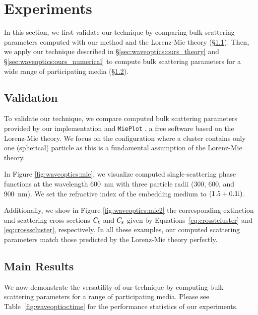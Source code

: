 \section{Experiments}
\label{sec:waveoptics:results}

In this section, we first validate our technique by comparing bulk scattering parameters computed with our method and the Lorenz-Mie theory (\S\ref{ssec:result_validation}).
Then, we apply our technique described in \S\ref{sec:waveoptics:ours_theory} and \S\ref{sec:waveoptics:ours_numerical} to compute bulk scattering parameters for a wide range of participating media (\S\ref{ssec:result_main}).


\subsection{Validation}
\label{ssec:result_validation}

To validate our technique, we compare computed bulk scattering parameters provided by our implementation and \texttt{MiePlot} \cite{laven2011mieplot}, a free software based on the Lorenz-Mie theory.
We focus on the configuration where a cluster contains only one (spherical) particle as this is a fundamental assumption of the Lorenz-Mie theory.



In Figure \ref{fig:waveoptics:mie}, we visualize computed single-scattering phase functions at the wavelength 600~nm with three particle radii (300, 600, and 900~nm).
We set the refractive index of the embedding medium to $(1.5 + 0.1\text{i})$.

Additionally, we show in Figure \ref{fig:waveoptics:mie2} the corresponding extinction and scattering cross sections $C_\mathrm{t}$ and $C_\mathrm{s}$ given by Equations~\eqref{eq:crosstcluster} and \eqref{eq:crossscluster}, respectively.
In all these examples, our computed scattering parameters match those predicted by the Lorenz-Mie theory perfectly.




\subsection{Main Results}
\label{ssec:result_main}
%
We now demonstrate the versatility of our technique by computing bulk scattering parameters for a range of participating media.
Please see Table~\ref{fig:waveoptics:time} for the performance statistics of our experiments.

